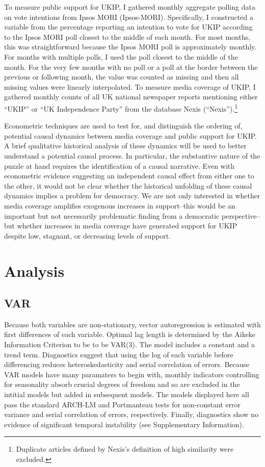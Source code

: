 \documentclass[12pt,article]{article}
\let\rmarkdownfootnote\footnote%
\def\footnote{\protect\rmarkdownfootnote}
\begin{document}
To measure public support for UKIP, I gathered monthly aggregate polling
data on vote intentions from Ipsos MORI (Ipsos-MORI). Specifically, I
constructed a variable from the percentage reporting an intention to
vote for UKIP according to the Ipsos MORI poll closest to the middle of
each month. For most months, this was straightforward because the Ipsos
MORI poll is approximately monthly. For months with multiple polls, I
used the poll closest to the middle of the month. For the very few
months with no poll or a poll at the border between the previous or
following month, the value was counted as missing and then all missing
values were linearly interpolated. To measure media coverage of UKIP, I
gathered monthly counts of all UK national newspaper reports mentioning
either ``UKIP'' or ``UK Independence Party'' from the database Nexis
(``Nexis'').\footnote{Duplicate articles defined by Nexis's definition of high similarity were excluded.}

Econometric techniques are used to test for, and distinguish the
ordering of, potential causal dynamics between media coverage and public
support for UKIP. A brief qualitative historical analysis of these
dynamics will be used to better understand a potential causal process.
In particular, the substantive nature of the puzzle at hand requires the
identification of a causal narrative. Even with econometric evidence
suggesting an independent causal effect from either one to the other, it
would not be clear whether the historical unfolding of these causal
dynamics implies a problem for democracy. We are not only interested in
whether media coverage amplifies exogenous increases in support--this
would be an important but not necessarily problematic finding from a
democratic perspective--but whether increases in media coverage have
generated support for UKIP despite low, stagnant, or decreasing levels
of support.

\section{Analysis}\label{analysis}

\subsection{VAR}\label{var}

Because both variables are non-stationary, vector autoregression is
estimated with first differences of each variable. Optimal lag length is
determined by the Aikeke Information Criterion to be to be VAR(3). The
model includes a constant and a trend term. Diagnostics suggest that
using the log of each variable before differencing reduces
heteroskedasticity and serial correlation of errors. Because VAR models
have many paramaters to begin with, monthly indicators controlling for
seasonality absorb crucial degrees of freedom and so are excluded in the
intitial models but added in subsequent models. The models displayed
here all pass the standard ARCH-LM and Portmanteau tests for
non-constant error variance and serial correlation of errors,
respectively. Finally, diagnostics show no evidence of significant
temporal instability (see Supplementary Information).
\end{document}
